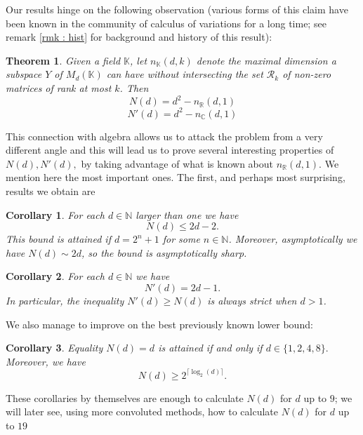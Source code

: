 \documentclass[11pt, a4paper, reqno]{elsarticle}
\newtheorem{theorem}{Theorem}[section]
\newtheorem{corollary}{Corollary}[theorem]
\theoremstyle{definition}
\theoremstyle{remark}
\begin{document}
Our results hinge on the following observation (various forms of this 
claim have been known in the community of calculus of variations
for a long time; see remark \ref{rmk : hist} for background and history of this result):
\begin{theorem}\label{thm : solchipot}
Given a field $\mathbb K$, let $n_{\mathbb K}(d,k)$ denote the maximal dimension
a subspace $Y$ of $M_d(\mathbb K)$ can have without intersecting the set $\mathcal R_k$ of non-zero matrices
of rank at most $k$. Then
    \begin{equation}
        N(d)=d^2-n_{\mathbb R}(d,1)
    \end{equation}
    \begin{equation*}
        N'(d)=d^2-n_{\mathbb{C}}(d,1)
    \end{equation*}
\end{theorem}
This connection with algebra allows us to attack the problem from a very different angle and this will lead us to prove several interesting properties of $N(d), N'(d),$
by taking advantage 
of what is known about $n_{\mathbb{R}}(d,1)$.
We mention here the most important ones. The first, and perhaps most surprising, results
we obtain are
\begin{corollary}\label{cor : asymptsolchip}
For each $d\in \mathbb N$ larger than one we have
    \begin{equation*}
        N(d)\le 2d-2.
    \end{equation*}
    This bound is attained if $d=2^n+1$ for some $n\in\mathbb N$.
    Moreover, asymptotically we have $N(d)\sim 2d$, so the bound is asymptotically sharp.
\end{corollary}
\begin{corollary}
For each $d\in \mathbb N$ we have
    \begin{equation*}
        N'(d)=2d-1.
    \end{equation*}
    In particular, the inequality $N'(d)\ge N(d)$ is always strict when $d>1$.
\end{corollary}
We also manage to improve on the best previously known lower bound:
\begin{corollary}
Equality $N(d)= d$ is attained if and only if $d\in\{1,2,4,8\}.$ Moreover, we have
\begin{equation*}
    N(d)\ge 2^{\lceil\log_2(d)\rceil}.
\end{equation*}
\end{corollary}
These corollaries by themselves are enough to calculate $N(d)$ for $d$ up to $9$; we will
later see, using more convoluted methods, how to calculate $N(d)$ for $d$ up to $19$
\end{document}
